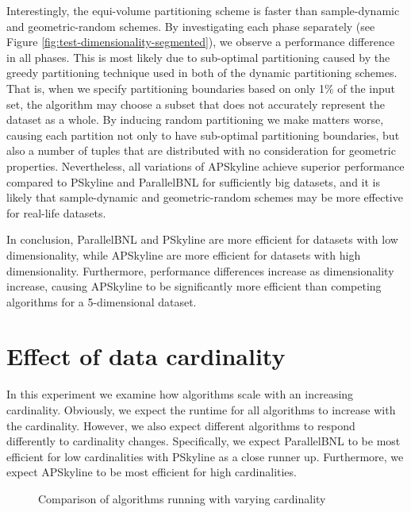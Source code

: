 \documentclass[12pt,a4paper,twoside]{report}
\begin{document}
Interestingly, the equi-volume partitioning scheme is faster than
sample-dynamic and geometric-random schemes. By investigating each
phase separately (see Figure \ref{fig:test-dimensionality-segmented}),
we observe a performance difference in all phases. This is most likely
due to sub-optimal partitioning caused by the greedy partitioning
technique used in both of the dynamic partitioning schemes. That is,
when we specify partitioning boundaries based on only 1\% of the input
set, the algorithm may choose a subset that does not accurately
represent the dataset as a whole. By inducing random partitioning we
make matters worse, causing each partition not only to have
sub-optimal partitioning boundaries, but also a number of tuples that
are distributed with no consideration for geometric properties.
Nevertheless, all variations of APSkyline achieve superior performance
compared to PSkyline and ParallelBNL for sufficiently big datasets,
and it is likely that sample-dynamic and geometric-random schemes may
be more effective for real-life datasets.

In conclusion, ParallelBNL and PSkyline are more efficient for
datasets with low dimensionality, while APSkyline are more efficient
for datasets with high dimensionality. Furthermore, performance
differences increase as dimensionality increase, causing APSkyline
to be significantly more efficient than competing algorithms for a
5-dimensional dataset.

\section{Effect of data cardinality}

In this experiment we examine how algorithms scale with an increasing
cardinality. Obviously, we expect the runtime for all algorithms to
increase with the cardinality. However, we also expect different
algorithms to respond differently to cardinality changes.
Specifically, we expect ParallelBNL to be most efficient for low
cardinalities with PSkyline as a close runner up. Furthermore, we
expect APSkyline to be most efficient for high cardinalities.

\begin{figure}[H]
	\centering
	\caption{Comparison of algorithms running with varying cardinality}
	\label{fig:test-cardinality}
\end{figure}
\end{document}
